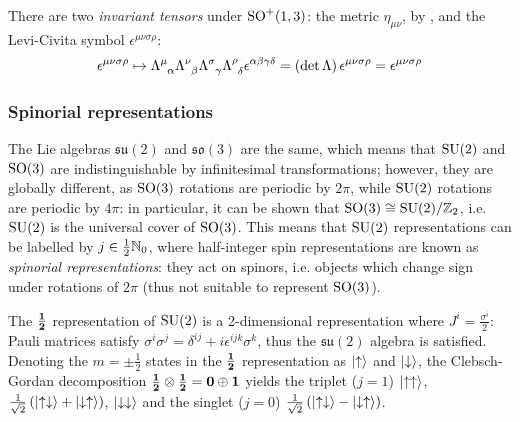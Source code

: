 There are two \textit{invariant tensors} under $ \mathrm{SO}^+(1,3) $: the metric $ \eta_{\mu \nu} $, by , and the Levi-Civita symbol $ \epsilon^{\mu \nu \sigma \rho} $:
\begin{equation*}
  \epsilon^{\mu \nu \sigma \rho} \mapsto \tensor{\Lambda}{^\mu_\alpha} \tensor{\Lambda}{^\nu_\beta} \tensor{\Lambda}{^\sigma_\gamma} \tensor{\Lambda}{^\rho_\delta} \epsilon^{\alpha \beta \gamma \delta} = \left( \det \Lambda \right) \epsilon^{\mu \nu \sigma \rho} = \epsilon^{\mu \nu \sigma \rho}
\end{equation*}

\subsubsection{Spinorial representations}

The Lie algebras $ \mathfrak{su}(2) $ and $ \mathfrak{so}(3) $ are the same, which means that $ \mathrm{SU}(2) $ and $ \mathrm{SO}(3) $ are indistinguishable by infinitesimal transformations; however, they are globally different, as $ \mathrm{SO}(3) $ rotations are periodic by $ 2\pi $, while $ \mathrm{SU}(2) $ rotations are periodic by $ 4\pi $: in particular, it can be shown that $ \mathrm{SO}(3) \cong \mathrm{SU}(2) / \mathbb{Z}_2 $, i.e. $ \mathrm{SU}(2) $ is the universal cover of $ \mathrm{SO}(3) $. This means that $ \mathrm{SU}(2) $ representations can be labelled by $ j \in \frac{1}{2} \mathbb{N}_0 $, where half-integer spin representations are known as \textit{spinorial representations}: they act on spinors, i.e. objects which change sign under rotations of $ 2\pi $ (thus not suitable to represent $ \mathrm{SO}(3) $).

\begin{example}{}{}
  The $ \mathbf{\frac{1}{2}} $ representation of $ \mathrm{SU}(2) $ is a 2-dimensional representation where $ J^i = \frac{\sigma^i}{2} $: Pauli matrices satisfy $ \sigma^i \sigma^j = \delta^{ij} + i \epsilon^{ijk} \sigma^k $, thus the $ \mathfrak{su}(2) $ algebra is satisfied. Denoting the $ m = \pm \frac{1}{2} $ states in the $ \mathbf{\frac{1}{2}} $ representation as $ \ket{\uparrow} $ and $ \ket{\downarrow} $, the Clebsch-Gordan decomposition $ \mathbf{\frac{1}{2}} \otimes \mathbf{\frac{1}{2}} = \mathbf{0} \oplus \mathbf{1} $ yields the triplet ($ j = 1 $) $ \ket{\uparrow\uparrow} $, $ \frac{1}{\sqrt{2}}\left( \ket{\uparrow\downarrow} + \ket{\downarrow\uparrow} \right) $, $ \ket{\downarrow\downarrow} $ and the singlet ($ j = 0 $) $ \frac{1}{\sqrt{2}}\left( \ket{\uparrow\downarrow} - \ket{\downarrow\uparrow} \right) $.
\end{example}

